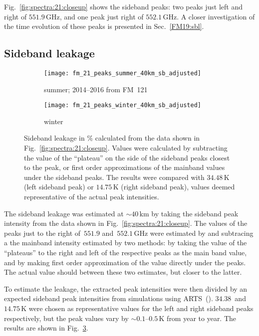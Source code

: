 Fig.~\ref{fig:spectra:21:closeup} shows the sideband peaks:  two peaks just
left and right of $551.9\,\mathrm{GHz}$, and one peak just right of
$552.1\,\mathrm{GHz}$.  A closer investigation of the time evolution of these
peaks is presented in Sec.~\ref{FM19:sbl}.


\subsection{Sideband leakage}
\label{FM21:sbl}

\begin{figure}[ht]
    \centering
    \begin{subfigure}[b]{0.9545\textwidth}
        \texttt{[image: fm\_21\_peaks\_summer\_40km\_sb\_adjusted]}
        \caption{summer; 2014--2016 from FM~121
            }\label{fig:sbl:21:summer}
    \end{subfigure}
    \begin{subfigure}[b]{0.9545\textwidth}
        \texttt{[image: fm\_21\_peaks\_winter\_40km\_sb\_adjusted]}
        \caption{winter}\label{fig:sbl:21:winter}
    \end{subfigure}
    \caption{Sideband leakage in \% calculated from the data shown in
        Fig.~\ref{fig:spectra:21:closeup}.  Values were calculated by
        subtracting the value of the ``plateau'' on the side of the sideband
        peaks closest to the  peak, or first order
        approximations of the mainband values under the sideband peaks.  The
        results were compared with $34.48\,\mathrm{K}$ (left sideband peak) or
        $14.75\,\mathrm{K}$ (right sideband peak), values deemed
        representative of the actual peak intensities.
        }\label{fig:sbl:21}
\end{figure}

\noindent
The sideband leakage was estimated at $\sim40\,\mathrm{km}$ by taking the
sideband peak intensity from the data shown in
Fig.~\ref{fig:spectra:21:closeup}. The values of the peaks just to the right
of~$551.9$ and~$552.1\,\mathrm{GHz}$ were estimated by and subtracing a the
mainband intensity estimated by two methods:  by taking the value of the
``plateaus'' to the right and left of the respective peaks as the main band
value, and by making first order approximation of the value directly under the
peaks.  The actual value should between these two estimates, but closer to the
latter.

To estimate the leakage, the extracted peak intensities were then
divided by an expected sideband peak intensities from simulations using
ARTS~(\cite{buehler:artst:05}).  $34.38$~and $14.75\,\mathrm{K}$ were chosen as
representative values for the left and right sideband peaks respectively, but
the peak values vary by $\sim0.1$--$0.5\,\mathrm{K}$ from year to year.  The
results are shown in Fig.~\ref{fig:sbl:21}.

